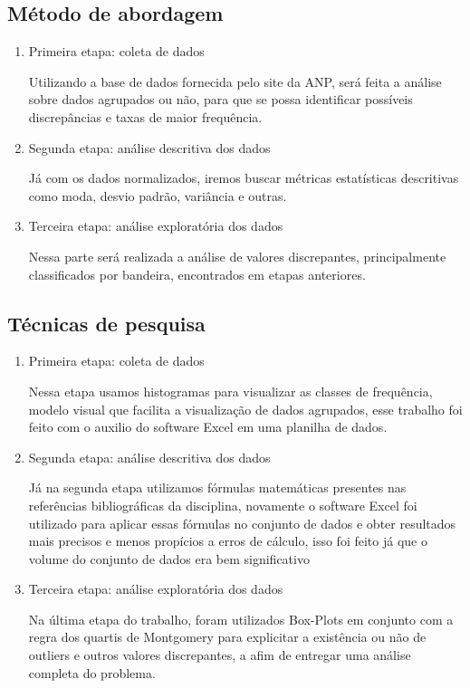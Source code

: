 \documentclass[12pt]{article}
\begin{document}
\subsection{Método de abordagem}

\begin{enumerate}
    \item Primeira etapa: coleta de dados

    Utilizando a base de dados fornecida pelo site da ANP, será feita a análise sobre dados agrupados ou não, para que se possa identificar possíveis discrepâncias e taxas de maior frequência.

    \item Segunda etapa: análise descritiva dos dados
    
    Já com os dados normalizados, iremos buscar métricas estatísticas descritivas como moda, desvio padrão, variância e outras.

    \item Terceira etapa: análise exploratória dos dados
    
    Nessa parte será realizada a análise de valores discrepantes, principalmente classificados por bandeira, encontrados em etapas anteriores.
\end{enumerate}

\subsection{Técnicas de pesquisa}

\begin{enumerate}
    \item Primeira etapa: coleta de dados

    Nessa etapa usamos histogramas para visualizar as classes de frequência, modelo visual que facilita a visualização de dados agrupados, esse trabalho foi feito com o auxilio do software Excel em uma planilha de dados. 

    \item Segunda etapa: análise descritiva dos dados
    
    Já na segunda etapa utilizamos fórmulas matemáticas presentes nas referências bibliográficas da disciplina, novamente o software Excel foi utilizado para aplicar essas fórmulas no conjunto de dados e obter resultados mais precisos e menos propícios a erros de cálculo, isso foi feito já que o volume do conjunto de dados era bem significativo

    \item Terceira etapa: análise exploratória dos dados
    
    Na última etapa do trabalho, foram utilizados Box-Plots em conjunto com a regra dos quartis de Montgomery para explicitar a existência ou não de outliers e outros valores discrepantes, a afim de entregar uma análise completa do problema.
\end{enumerate}
\end{document}
